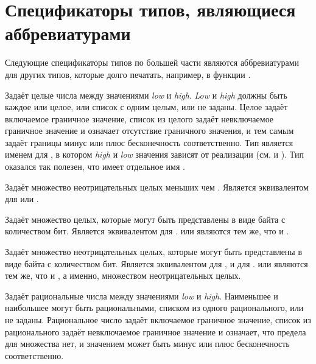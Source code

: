 \section{Спецификаторы типов, являющиеся аббревиатурами}

Следующие спецификаторы типов по большей части являются аббревиатурами для других
типов, которые долго печатать, например, в функции .
\begin{flushdesc}

\item[\cd{(integer \emph{low} \emph{high})}]
  Задаёт целые числа между значениями \emph{low} и
  \emph{high}. \emph{Low} и \emph{high} должны быть
  каждое или целое, или список с одним целым, или не заданы.
  Целое задаёт включаемое граничное значение, список из целого задаёт невключаемое
  граничное значение и \cdf{*} означает отсутствие граничного значения, и тем самым
  задаёт границы минус или плюс бесконечность соответственно.
  Тип  является именем для , в котором \emph{high} и \emph{low}
  значения зависят от реализации (см.  и
  ).
  Тип  оказался так полезен, что имеет отдельное имя .

\item[\cd{(mod \emph{n})}]
  Задаёт множество неотрицательных целых меньших чем . Является эквивалентом
  для  или .

\item[\cd{(signed-byte \emph{s})}]
  Задаёт множество целых, которые могут быть представлены в виде байта с 
  количеством бит. Является эквивалентом для .
   или  являются тем же, что и .

\item[\cd{(unsigned-byte \emph{s})}]
  Задаёт множество неотрицательных целых, которые могут быть представлены в виде байта с 
  количеством бит. Является эквивалентом для , и для .
   или  являются тем же, что и
  , а именно, множеством неотрицательных целых.

\item[\cd{(rational \emph{low} \emph{high})}]
  Задаёт рациональные числа между значениями \emph{low} и
  \emph{high}. Наименьшее и наибольшее могут быть рациональными, списком
  из одного рационального, или не заданы.
  Рациональное число задаёт включаемое граничное значение, список из
  рационального задаёт невключаемое граничное значение и \cdf{*} означает, что
  предела для множества нет, и значением может быть минус или плюс бесконечность соответственно.


\end{flushdesc}
